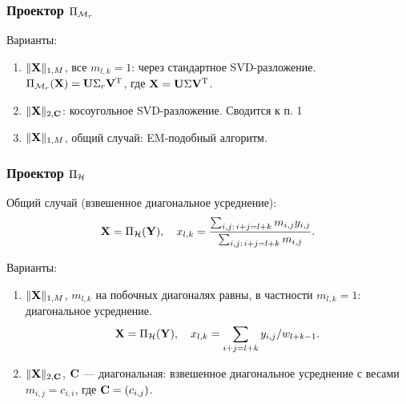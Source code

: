 \documentclass[unicode, notheorems]{beamer}
\begin{document}
\begin{frame}
	\frametitle{Проектор $\Pi_{\mathcal{M}_r}$}
	Варианты:
	\begin{enumerate}
		\item $\|\mathbf{X}\|_{1, M}$, все $m_{l, k} = 1$: через стандартное SVD-разложение. $\Pi_{\mathcal{M}_r}(\mathbf{X}) = \mathbf{U} \Sigma_r \mathbf{V}^{\mathrm{T}}$, где $\mathbf{X} = \mathbf{U} \Sigma \mathbf{V}^{\mathrm{T}}$.
		
		\vspace{0.2cm}
		\item $\|\mathbf{X}\|_{2, \mathbf{C}}$: косоугольное SVD-разложение. Сводится к п. 1
		
		\vspace{0.2cm}
		\item $\|\mathbf{X}\|_{1, M}$, общий случай: EM-подобный алгоритм.

	\end{enumerate}
\end{frame}

\begin{frame}
	\frametitle{Проектор $\Pi_{\mathcal{H}}$}
	Общий случай (взвешенное диагональное усреднение):
	\begin{equation*}
		\mathbf{X} = \Pi_{\mathcal{H}}(\mathbf{Y}), \quad x_{l,k} = \frac{\sum_{i,j:\, i+j=l+k} m_{i, j} y_{i,j}}{\sum_{i,j:\, i+j=l+k} m_{i,j}}.
	\end{equation*}
		
	Варианты:
	\begin{enumerate}
		\item $\|\mathbf{X}\|_{1, M}$, $m_{l,k}$ на побочных диагоналях равны, в частности $m_{l, k} = 1$: диагональное усреднение.
		\begin{equation*}
		\mathbf{X} = \Pi_{\mathcal{H}}(\mathbf{Y}), \quad x_{l,k} = \sum_{i + j = l + k} y_{i, j} / w_{l + k - 1}.
		\end{equation*}
		\item $\|\mathbf{X}\|_{2, \mathbf{C}}$, $\mathbf{C}$ --- диагональная: взвешенное диагональное усреднение с весами $m_{i,j} = c_{i, i}$, где $\mathbf{C} = (c_{i, j})$.
		
	\end{enumerate}
\end{frame}
\end{document}
